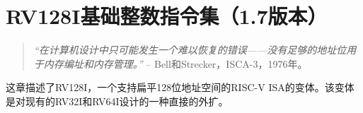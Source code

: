 \chapter{RV128I基础整数指令集（1.7版本）}
\label{rv128}

\begin{quote}
{\em  “在计算机设计中只可能发生一个难以恢复的错误——没有足够的地址位用于内存编址和内存管理。”} -- Bell和Strecker，ISCA-3，1976年。
\end{quote}

这章描述了RV128I，一个支持扁平128位地址空间的RISC-V ISA的变体。该变体是对现有的RV32I和RV64I设计的一种直接的外扩。


